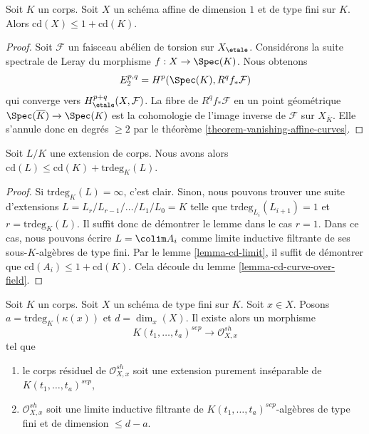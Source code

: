\begin{lemma}
\label{lemma-cd-curve-over-field}
Soit $K$ un corps. Soit $X$ un schéma affine de dimension $1$
et de type fini sur $K$. Alors
$\text{cd}(X) \leq 1 + \text{cd}(K)$.
\end{lemma}

\begin{proof}
Soit $\mathcal{F}$ un faisceau abélien de torsion sur $X_\etale$.
Considérons la suite spectrale de Leray du morphisme
$f : X \to \Spec(K)$. Nous obtenons
$$
E_2^{p, q} = H^p(\Spec(K), R^qf_*\mathcal{F})
$$
qui converge vers $H^{p + q}_\etale(X, \mathcal{F})$.
La fibre de $R^qf_*\mathcal{F}$ en un point géométrique
$\Spec(\overline{K}) \to \Spec(K)$ est la cohomologie de l'image
inverse de $\mathcal{F}$ sur $X_{\overline{K}}$.
Elle s'annule donc en degrés $\geq 2$ par le
théorème \ref{theorem-vanishing-affine-curves}.
\end{proof}

\begin{lemma}
\label{lemma-cd-field-extension}
Soit $L/K$ une extension de corps. Nous avons alors
$\text{cd}(L) \leq \text{cd}(K) + \text{trdeg}_K(L)$.
\end{lemma}

\begin{proof}
Si $\text{trdeg}_K(L) = \infty$, c'est clair.
Sinon, nous pouvons trouver une suite d'extensions
$L= L_r/L_{r - 1}/ \ldots /L_1/L_0 = K$ telle que
$\text{trdeg}_{L_i}(L_{i + 1}) = 1$ et $r = \text{trdeg}_K(L)$.
Il suffit donc de démontrer le lemme dans le cas $r = 1$.
Dans ce cas, nous pouvons écrire $L = \colim A_i$
comme limite inductive filtrante de ses sous-$K$-algèbres de type fini.
Par le lemme \ref{lemma-cd-limit}, il suffit de démontrer que
$\text{cd}(A_i) \leq 1 + \text{cd}(K)$. Cela découle
du lemme \ref{lemma-cd-curve-over-field}.
\end{proof}

\begin{lemma}
\label{lemma-strictly-henselian}
Soit $K$ un corps. Soit $X$ un schéma de type fini sur $K$.
Soit $x \in X$. Posons $a = \text{trdeg}_K(\kappa(x))$
et $d = \dim_x(X)$. Il existe alors un morphisme
$$
K(t_1, \ldots, t_a)^{sep} \longrightarrow \mathcal{O}_{X, x}^{sh}
$$
tel que
\begin{enumerate}
\item le corps résiduel de $\mathcal{O}_{X, x}^{sh}$ soit une extension purement inséparable
de $K(t_1, \ldots, t_a)^{sep}$,
\item $\mathcal{O}_{X, x}^{sh}$ soit une limite inductive filtrante de
$K(t_1, \ldots, t_a)^{sep}$-algèbres de type fini et de dimension $\leq d - a$.
\end{enumerate}
\end{lemma}

